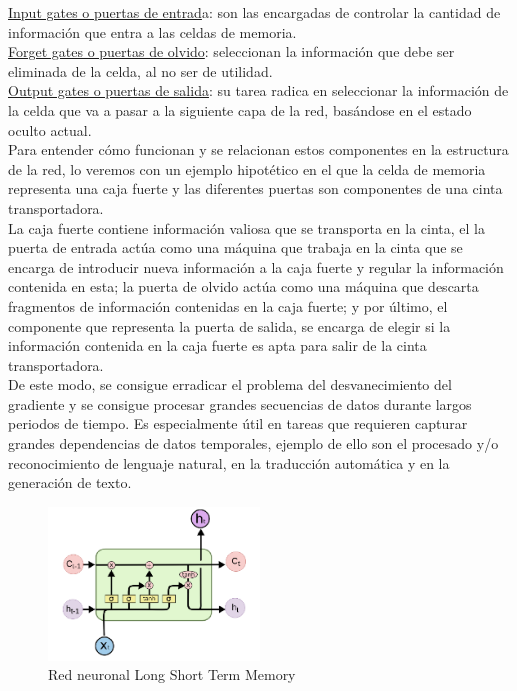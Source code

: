 \underline{Input gates o puertas de entrad}a: son las encargadas de controlar la cantidad de información que entra a las celdas de memoria.\\

\underline{Forget gates o puertas de olvido}: seleccionan la información que debe ser eliminada de la celda, al no ser de utilidad.\\

\underline{Output gates o puertas de salida}: su tarea radica en seleccionar la información de la celda que va a pasar a la siguiente capa de la red, basándose en el estado oculto actual.\\

Para entender cómo funcionan y se relacionan estos componentes en la estructura de la red, lo veremos con un ejemplo hipotético en el que la celda de memoria representa una caja fuerte y las diferentes puertas son componentes de una cinta transportadora. \\

La caja fuerte contiene información valiosa que se transporta en la cinta, el la puerta de entrada actúa como una máquina que trabaja en la cinta que se encarga de introducir nueva información a la caja fuerte y regular la información contenida en esta; la puerta de olvido actúa como una máquina que descarta fragmentos de información contenidas en la caja fuerte; y por último, el componente que representa la puerta de salida, se encarga de elegir si la información contenida en la caja fuerte es apta para salir de la cinta transportadora. \\

De este modo, se consigue erradicar el problema del desvanecimiento del gradiente y se consigue procesar grandes secuencias de datos durante largos periodos de tiempo. Es especialmente útil en tareas que requieren capturar grandes dependencias de datos temporales, ejemplo de ello son el procesado y/o reconocimiento de lenguaje natural, en la traducción automática y en la generación de texto.\\

\begin{figure}[h]
	\centering
	\includegraphics[width = 0.5\textwidth]{Imagenes/Vectorial/lstm.png}
	\caption{Red neuronal Long Short Term Memory}
	\label{fig:lstm}
\end{figure}



